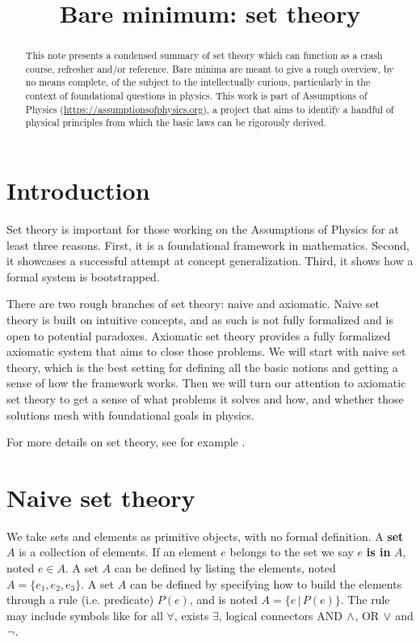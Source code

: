 \documentclass{article}
\title{Bare minimum: set theory}
\date{\vspace{-5ex}}
\begin{document}
\maketitle


\begin{abstract}
This note presents a condensed summary of set theory which can function as a crash course, refresher and/or reference. Bare minima are meant to give a rough overview, by no means complete, of the subject to the intellectually curious, particularly in the context of foundational questions in physics. This work is part of Assumptions of Physics (\url{https://assumptionsofphysics.org}), a project that aims to identify a handful of physical principles from which the basic laws can be rigorously derived.
\end{abstract}


\section{Introduction}

Set theory is important for those working on the Assumptions of Physics for at least three reasons. First, it is a foundational framework in mathematics. Second, it showcases a successful attempt at concept generalization. Third, it shows how a formal system is bootstrapped.

There are two rough branches of set theory: naive and axiomatic. Naive set theory is built on intuitive concepts, and as such is not fully formalized and is open to potential paradoxes. Axiomatic set theory provides a fully formalized axiomatic system that aims to close those problems. We will start with naive set theory, which is the best setting for defining all the basic notions and getting a sense of how the framework works. Then we will turn our attention to axiomatic set theory to get a sense of what problems it solves and how, and whether those solutions mesh with foundational goals in physics.

For more details on set theory, see for example \cite{settheory-tutorial, pinter2014book}.

\section{Naive set theory}

We take sets and elements as primitive objects, with no formal definition. A \textbf{set} $A$ is a collection of elements. If an element $e$ belongs to the set we say $e$ \textbf{is in} $A$, noted $ e 
\in A$. A set $A$ can be defined by listing the elements, noted $A = \{ e_1, e_2, e_3 \}$. A set $A$ can be defined by specifying how to build the elements through a rule (i.e. predicate) $P(e)$, and is noted $A = \{e \, | \,  P(e) \}$. The rule may include symbols like for all $\forall$, exists $\exists$, logical connectors AND $\wedge$, OR $\vee$ and $\neg$.
\end{document}
